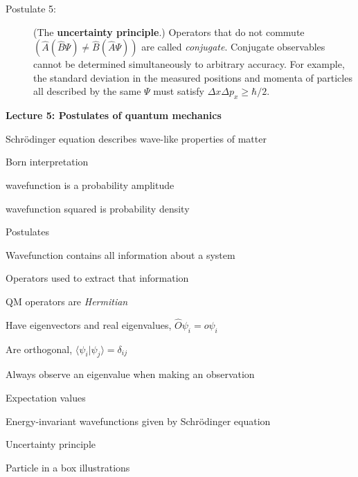 \documentclass[11pt]{article}
\begin{document}
\begin{outline}
\begin{table}
\begin{center}
\begin{description}
{}
    \item[Postulate 5:] (The {\bf uncertainty principle}.)  Operators that do not commute
      $(\hat{A}(\hat{B}\Psi)\neq\hat{B}(\hat{A}\Psi))$ are called {\em conjugate}.
      Conjugate observables cannot be determined simultaneously to arbitrary accuracy.
      For example, the standard deviation in the measured positions and momenta of
      particles all described by the same $\Psi$ must satisfy $\Delta x\Delta p_x \geq \hbar/2$.
    \end{description}
\end{center}
\end{table}

\item{{\bf Lecture 5: Postulates of quantum mechanics}}
  \begin{outline}
  \item{Schr\"{o}dinger equation describes wave-like properties of matter}
  \item{Born interpretation}
    \begin{outline}
      \item wavefunction is a probability amplitude
      \item wavefunction squared is probability density
    \end{outline}

  \item{Postulates}
    \begin{outline}
    \item{Wavefunction contains all information about a system}
    \item{Operators used to extract that information}
      \begin{outline}
      \item QM operators are {\em Hermitian}
      \item Have eigenvectors and real eigenvalues, $\hat{O}\psi_i=o\psi_i$
      \item Are orthogonal, $\langle \psi_i | \psi_j \rangle = \delta_{ij}$
      \item Always observe an eigenvalue when making an observation
      \end{outline}
    \item{Expectation values}
    \item{Energy-invariant wavefunctions given by Schr\"odinger equation}
    \item{Uncertainty principle}
    \end{outline}
  \item{Particle in a box illustrations}
  \end{outline}


\end{outline}
\end{document}
